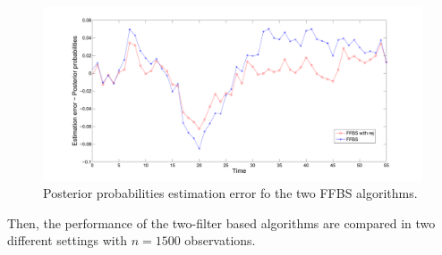 \begin{figure}
\centering
\includegraphics[scale=.3]{err_est_ffbs}
\caption{Posterior probabilities estimation error fo the two FFBS algorithms.}
\label{fig:ffbs:err}
\end{figure}

Then, the performance of the two-filter based algorithms are compared in two different settings with $n=1500$ observations.
